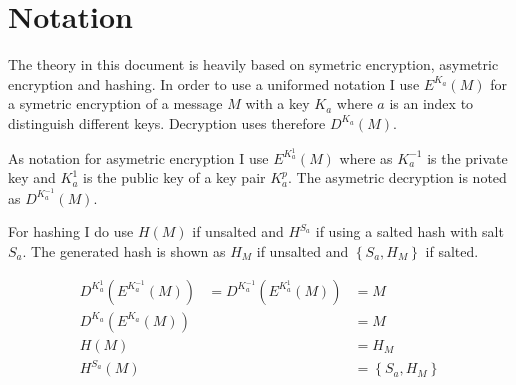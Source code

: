 \section{Notation}
The theory in this document is heavily based on symetric encryption, asymetric encryption and hashing. In order to use a uniformed notation I use $E^{K_a}(M)$ for a symetric encryption of a message $M$ with a key $K_a$ where $a$ is an index to distinguish different keys. Decryption uses therefore $D^{K_a}(M)$.\par
As notation for asymetric encryption I use $E^{K^{1}_a}(M)$ where as $K^{-1}_a$ is the private key and $K^{1}_a$ is the public key of a key pair $K^p_a$. The asymetric decryption is noted as $D^{K^{-1}_a}(M)$.\par
For hashing I do use $H(M)$ if unsalted and $H^{S_a}$ if using a salted hash with salt $S_a$. The generated hash is shown as $H_M$ if unsalted and $\left\lbrace S_a,H_M\right\rbrace$ if salted.\par

\begin{eqnarray}
D^{K^{1}_a}\left(E^{K^{-1}_a}\left(M\right)\right)&=D^{K^{-1}_a}\left(E^{K^{1}_a}\left(M\right)\right)&=M\\
D^{K_a}\left(E^{K_a}\left(M\right)\right)&~&=M\\
H\left(M\right)&~&=H_M\\
H^{S_a}\left(M\right)&~&=\left\lbrace S_a,H_M\right\rbrace
\end{eqnarray}
